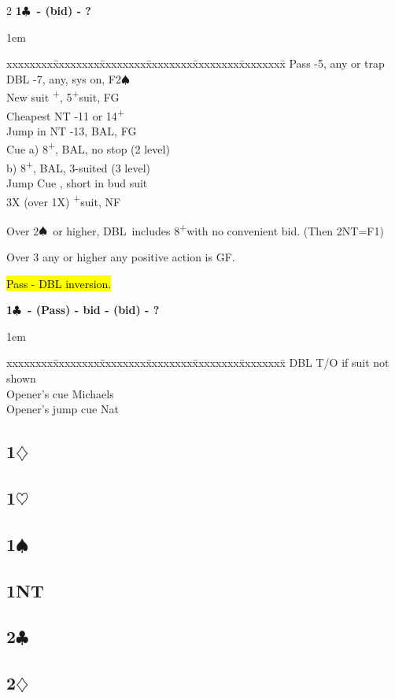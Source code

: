 \documentclass[10pt]{article}
\renewcommand{\c}{$\clubsuit$}
\renewcommand{\d}{$\diamondsuit$}
\newcommand{\h}{$\heartsuit$}
\newcommand{\s}{$\spadesuit$}
\newcommand{\p}{\textsuperscript{+}}
\newcommand{\x}{DBL}
\newenvironment{bidtable}[1][]
{\textbf{#1}
  \begin{adjustwidth}{1em}{}
    \addvspace{2pt}
    \begin{tabbing}
      xxxxxxxx\=xxxxxxxx\=xxxxxxxx\=xxxxxxxx\=xxxxxxxx\=xxxxxxxx\=\kill}
{\end{tabbing}\end{adjustwidth}\bigskip}%
\newcommand{\pdfc}{\texorpdfstring{\c{}}{C}}
\newcommand{\pdfd}{\texorpdfstring{\d{}}{D}}
\newcommand{\pdfh}{\texorpdfstring{\h{}}{H}}
\newcommand{\pdfs}{\texorpdfstring{\s{}}{S}}
\begin{document}
\begin{multicols*}{2}
\begin{bidtable}[1\c\ - (bid) - ?]
Pass         \>  -5, any or trap                \\
\x           \>  -7, any, sys on, F2\s                \\
New suit     \>  \p, 5\p suit, FG               \\
Cheapest NT  \>  -11 or 14\p                    \\
Jump in NT   \>  -13, BAL, FG                  \\
Cue          \>  \> a) 8\p, BAL, no stop (2 level)  \\
             \>  \> b) 8\p, BAL, 3-suited (3 level) \\
Jump Cue     \>  , short in bud suit         \\
3X (over 1X) \>  \p suit, NF
\end{bidtable}

Over 2\s\ or higher, \x\ includes 8\p with no convenient bid. (Then 2NT=F1)

Over 3 any or higher any positive action is GF.

\hl{Pass - DBL inversion.}

\begin{bidtable}[1\c\ - (Pass) - bid - (bid) - ?]
\x                \>  \> T/O if suit not shown \\
Opener's cue      \>  \> Michaels              \\
Opener's jump cue \>  \> Nat
\end{bidtable}

\subsection{1\pdfd}
\subsection{1\pdfh}
\subsection{1\pdfs}
\subsection{1NT}
\subsection{2\pdfc}
\subsection{2\pdfd}

\end{multicols*}
\end{document}
